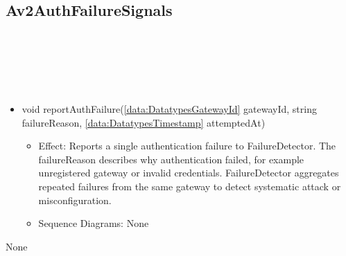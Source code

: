   \subsection{Av2AuthFailureSignals}\label{int:InterfacesAv2AuthFailureSignals}
    \begin{description}
      \item[Provided by:] \iconcomponent{}~
      \item[Required by:] \iconcomponent{}~ 
      \item[Operations:] ~
    \begin{itemize}[noitemsep,nolistsep,leftmargin=-.25cm]
      \item \textsf{void reportAuthFailure(\ref{data:DatatypesGatewayId} gatewayId, string failureReason, \ref{data:DatatypesTimestamp} attemptedAt)}
        \begin{itemize}[noitemsep,nolistsep]
           \item Effect: Reports a single authentication failure to FailureDetector. The failureReason describes why authentication failed, for example unregistered gateway or invalid credentials. FailureDetector aggregates repeated failures from the same gateway to detect systematic attack or misconfiguration. 
           \item Sequence Diagrams: None
        \end{itemize}
    \end{itemize}
      \item[Diagrams:] None
    \end{description}

